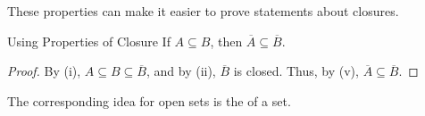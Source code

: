These properties can make it easier to prove statements about closures.

\begin{exbox}{Using Properties of Closure}{}
    If $A \subseteq B$, then $\overline{A} \subseteq \overline{B}$.
    \tcblower
    \begin{proof}
        By (i), $A \subseteq B \subseteq \overline{B}$, and by (ii), $\overline{B}$ is closed. Thus, by (v), $\overline{A} \subseteq \overline{B}$.
    \end{proof}
\end{exbox}

\begin{notebox}
    The corresponding idea for open sets is the  of a set.
\end{notebox}
